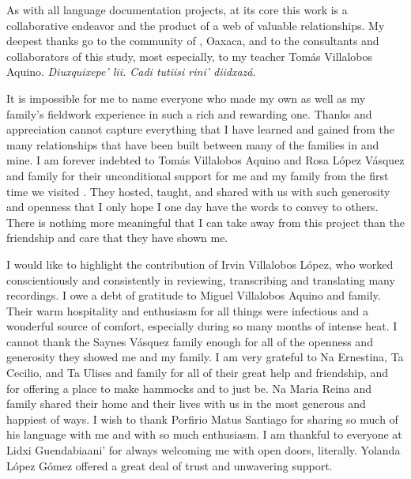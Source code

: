 \begin{refsection}

As with all language documentation projects, at its core this work is a collaborative endeavor and the product of a web of valuable relationships. My deepest thanks go to the community of , Oaxaca, and to the consultants and collaborators of this study, most especially, to my teacher Tom\'{a}s Villalobos Aquino. \textit{Diuxquixepe’ lii. Cadi tutiisi rini’ diidxaz\'{a}}. 

It is impossible for me to name everyone who made my own as well as my family’s fieldwork experience in  such a rich and rewarding one. Thanks and appreciation cannot capture everything that I have learned and gained from the many relationships that have been built between many of the families in  and mine. I am forever indebted to Tom\'{a}s Villalobos Aquino and Rosa L\'{o}pez V\'{a}squez and family for their unconditional support for me and my family from the first time we visited . They hosted, taught, and shared with us with such generosity and openness that I only hope I one day have the words to convey to others. There is nothing more meaningful that I can take away from this project than the friendship and care that they have shown me.

I would like to highlight the contribution of Irvin Villalobos L\'{o}pez, who worked conscientiously and consistently in reviewing, transcribing and translating many recordings. I owe a debt of gratitude to Miguel Villalobos Aquino and family. Their warm hospitality and enthusiasm for all things were infectious and a wonderful source of comfort, especially during so many months of intense heat. I cannot thank the Saynes V\'{a}squez family enough for all of the openness and generosity they showed me and my family. I am very grateful to Na Ernestina, Ta Cecilio, and Ta Ulises and family for all of their great help and friendship, and for offering a place to make hammocks and to just be. Na Maria Reina and family shared their home and their lives with us in the most generous and happiest of ways. I wish to thank Porfirio Matus Santiago for sharing so much of his language with me and with so much enthusiasm. I am thankful to everyone at Lidxi Guendabiaani’ for always welcoming me with open doors, literally. Yolanda L\'{o}pez G\'{o}mez offered a great deal of trust and unwavering support. 


\end{refsection}
